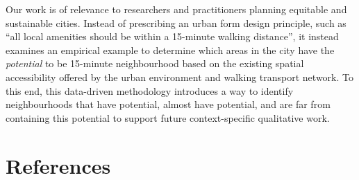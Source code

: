 \documentclass[
  authoryear,
  preprint,
  3p]{elsarticle}
\begin{document}
Our work is of relevance to researchers and practitioners planning
equitable and sustainable cities. Instead of prescribing an urban form
design principle, such as ``all local amenities should be within a
15-minute walking distance'', it instead examines an empirical example
to determine which areas in the city have the \emph{potential} to be
15-minute neighbourhood based on the existing spatial accessibility
offered by the urban environment and walking transport network. To this
end, this data-driven methodology introduces a way to identify
neighbourhoods that have potential, almost have potential, and are far
from containing this potential to support future context-specific
qualitative work.

\section{References}\label{references}

\renewcommand{\bibsection}{}

\end{document}
